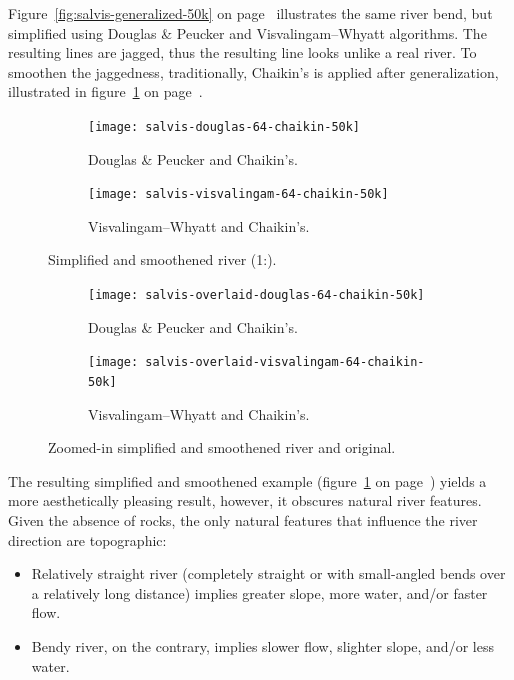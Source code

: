 \documentclass[a4paper]{article}
\newcommand{\onpage}[1]{\ref{#1} on page~\pageref{#1}}
\newcommand{\DP}{Douglas \& Peucker}
\newcommand{\VW}{Visvalingam--Whyatt}
\begin{document}
Figure~\onpage{fig:salvis-generalized-50k} illustrates the same river bend, but
simplified using {\DP} and {\VW} algorithms. The resulting lines are jagged,
thus the resulting line looks unlike a real river. To smoothen the jaggedness,
traditionally, Chaikin's\cite{chaikin1974algorithm} is applied after
generalization, illustrated in
figure~\onpage{fig:salvis-generalized-chaikin-50k}.

\begin{figure}[ht]
    \centering
    \begin{subfigure}[b]{.49\textwidth}
        \texttt{[image: salvis-douglas-64-chaikin-50k]}
        \caption{{\DP} and Chaikin's.}
    \end{subfigure}
    \hfill
    \begin{subfigure}[b]{.49\textwidth}
        \texttt{[image: salvis-visvalingam-64-chaikin-50k]}
        \caption{{\VW} and Chaikin's.}
    \end{subfigure}
    \caption{Simplified and smoothened river (1:).}
    \label{fig:salvis-generalized-chaikin-50k}
\end{figure}

\begin{figure}[ht]
    \centering
    \begin{subfigure}[b]{.49\textwidth}
        \texttt{[image: salvis-overlaid-douglas-64-chaikin-50k]}
        \caption{{\DP} and Chaikin's.}
    \end{subfigure}
    \hfill
    \begin{subfigure}[b]{.49\textwidth}
        \texttt{[image: salvis-overlaid-visvalingam-64-chaikin-50k]}
        \caption{{\VW} and Chaikin's.}
    \end{subfigure}
    \caption{Zoomed-in simplified and smoothened river and original.}
    \label{fig:salvis-overlaid-generalized-chaikin-50k}
\end{figure}

The resulting simplified and smoothened example
(figure~\onpage{fig:salvis-generalized-chaikin-50k}) yields a more
aesthetically pleasing result, however, it obscures natural river features.
Given the absence of rocks, the only natural features that influence the river
direction are topographic:

\begin{itemize}

    \item Relatively straight river (completely straight or with small-angled
        bends over a relatively long distance) implies greater slope, more
        water, and/or faster flow.

    \item Bendy river, on the contrary, implies slower flow, slighter slope,
        and/or less water.

\end{itemize}
\end{document}
